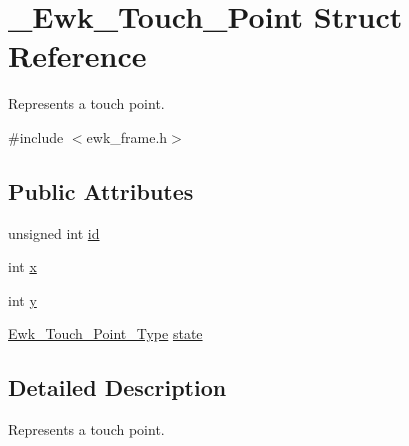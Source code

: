 \hypertarget{struct__Ewk__Touch__Point}{\section{\+\_\+\+Ewk\+\_\+\+Touch\+\_\+\+Point Struct Reference}
\label{struct__Ewk__Touch__Point}
}


Represents a touch point.  




{\ttfamily \#include $<$ewk\+\_\+frame.\+h$>$}

\subsection*{Public Attributes}
\begin{DoxyCompactItemize}
\item 
unsigned int \hyperlink{struct__Ewk__Touch__Point_af88ddf2a25cbe6b911e945df64d25821}{id}
\item 
int \hyperlink{struct__Ewk__Touch__Point_abb6aea835ff98e71af22e1dd3523a123}{x}
\item 
int \hyperlink{struct__Ewk__Touch__Point_ad686c71c608ed1ca11dcd4853964a531}{y}
\item 
\hyperlink{ewk__frame_8h_a25a4e7f2c01b49665661a667bb4ea63e}{Ewk\+\_\+\+Touch\+\_\+\+Point\+\_\+\+Type} \hyperlink{struct__Ewk__Touch__Point_ac729779f54e01949977ef51e24749740}{state}
\end{DoxyCompactItemize}


\subsection{Detailed Description}
Represents a touch point. 

